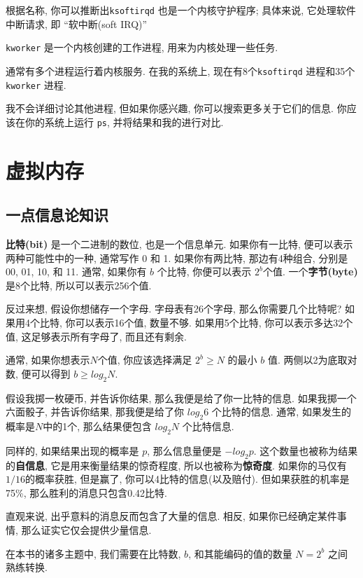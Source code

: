 \documentclass[12pt]{book}
\begin{document}
{根据名称, 你可以推断出{\tt ksoftirqd} 也是一个内核守护程序;
具体来说, 它处理软件中断请求, 即 ``软中断(soft IRQ)''

{\tt kworker} 是一个内核创建的工作进程, 用来为内核处理一些任务.

通常有多个进程运行着内核服务.
在我的系统上, 现在有8个{\tt ksoftirqd} 进程和35个{\tt kworker} 进程.

我不会详细讨论其他进程, 但如果你感兴趣, 
你可以搜索更多关于它们的信息.
你应该在你的系统上运行 {\tt ps}, 并将结果和我的进行对比.



\chapter{虚拟内存}

\section{一点信息论知识}

{\bf 比特(bit)} 是一个二进制的数位, 也是一个信息单元.
如果你有一比特, 便可以表示两种可能性中的一种, 通常写作 0 和 1.
如果你有两比特, 那边有4种组合, 分别是 00, 01, 10, 和 11.
通常, 如果你有 $b$ 个比特, 你便可以表示 $2^b$个值.
一个{\bf 字节(byte)} 是8个比特, 所以可以表示256个值.

反过来想, 假设你想储存一个字母. 字母表有26个字母, 
那么你需要几个比特呢? 如果用4个比特, 你可以表示16个值, 数量不够.
如果用5个比特, 你可以表示多达32个值, 这足够表示所有字母了, 而且还有剩余.

通常, 如果你想表示$N$个值, 你应该选择满足 $2^b \ge N$ 的最小 $b$ 值.
两侧以2为底取对数, 便可以得到 $b \ge log_2 N$.

假设我掷一枚硬币, 并告诉你结果, 那么我便是给了你一比特的信息.
如果我掷一个六面骰子, 并告诉你结果, 那我便是给了你 $log_2 6$ 个比特的信息.
通常, 如果发生的概率是$N$中的1个, 那么结果便包含 $log_2 N$ 个比特信息.

同样的, 如果结果出现的概率是 $p$, 那么信息量便是 $-log_2 p$.
这个数量也被称为结果的{\bf 自信息}, 它是用来衡量结果的惊奇程度, 
所以也被称为{\bf 惊奇度}. 如果你的马仅有$1/16$的概率获胜,
但是赢了, 你可以4比特的信息(以及赔付). 
但如果获胜的机率是75\%, 那么胜利的消息只包含0.42比特.

直观来说, 出乎意料的消息反而包含了大量的信息.
相反, 如果你已经确定某件事情, 那么证实它仅会提供少量信息.

在本书的诸多主题中, 我们需要在比特数, $b$, 和其能编码的值的数量 $N = 2^b$ 之间
熟练转换.


}
\end{document}
